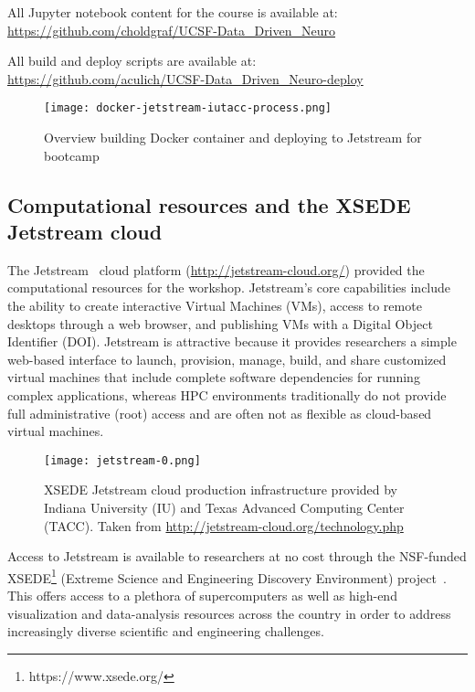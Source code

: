 All Jupyter notebook content for the course is available at:\\
\indent\indent\url{https://github.com/choldgraf/UCSF-Data_Driven_Neuro}

All build and deploy scripts are available at:\\
\indent\indent\url{https://github.com/aculich/UCSF-Data_Driven_Neuro-deploy}

\begin{figure}[h]
\centering
\texttt{[image: docker-jetstream-iutacc-process.png]}
\caption{Overview building Docker container and deploying to Jetstream for bootcamp}
\end{figure}

\subsection{Computational resources and the XSEDE Jetstream cloud}

The Jetstream~\cite{Stewart2015Jetstream} cloud platform
(\url{http://jetstream-cloud.org/}) provided the computational resources for the
workshop. Jetstream's core capabilities include the ability to create
interactive Virtual Machines (VMs), access to remote desktops through a web
browser, and publishing VMs with a Digital Object Identifier (DOI). Jetstream is
attractive because it provides researchers a simple web-based
interface\cite{NiravCyberinfra2016} to launch, provision, manage, build, and
share customized virtual machines that include complete software dependencies
for running complex applications, whereas HPC environments traditionally do not
provide full administrative (root) access and are often not as flexible as
cloud-based virtual machines.

\begin{figure}[h]
\centering
\texttt{[image: jetstream-0.png]}
\caption{XSEDE Jetstream cloud production infrastructure provided by Indiana University (IU) and Texas Advanced Computing Center (TACC). Taken from \url{http://jetstream-cloud.org/technology.php}}
\end{figure}

Access to Jetstream is available to researchers at no cost through the
NSF-funded XSEDE\footnote{https://www.xsede.org/} (Extreme Science and
Engineering Discovery Environment) project~\cite{Towns2014XSEDE}. This
offers access to a plethora of supercomputers as well as high-end
visualization and data-analysis resources across the
country in order to address increasingly diverse scientific and
engineering challenges.


